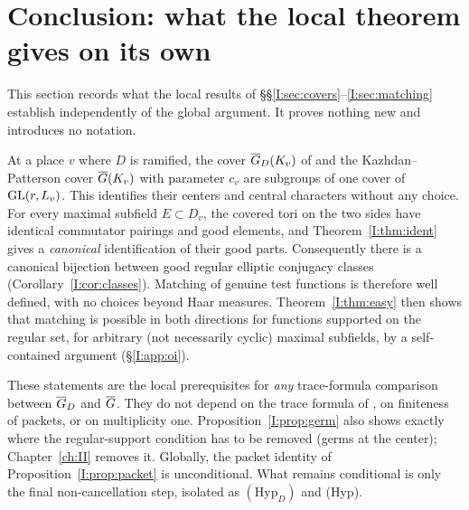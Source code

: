 \section{Conclusion: what the local theorem gives on its own}\label{I:sec:conclusion}
This section records what the local results of \S\S\ref{I:sec:covers}--\ref{I:sec:matching} establish independently of the global argument. It proves nothing new and introduces no notation.

At a place $v$ where $D$ is ramified, the cover $\overline{G}_D(K_v)$ of \cite{JC26a} and the Kazhdan--Patterson cover $\overline{G}(K_v)$ with parameter $c_v$ are subgroups of one cover of $\mathrm{GL}(r,L_v)$. This identifies their centers and central characters without any choice. For every maximal subfield $E\subset D_v$, the covered tori on the two sides have identical commutator pairings and good elements, and Theorem~\ref{I:thm:ident} gives a \emph{canonical} identification of their good parts. Consequently there is a canonical bijection between good regular elliptic conjugacy classes (Corollary~\ref{I:cor:classes}). Matching of genuine test functions is therefore well defined, with no choices beyond Haar measures. Theorem~\ref{I:thm:easy} then shows that matching is possible in both directions for functions supported on the regular set, for arbitrary (not necessarily cyclic) maximal subfields, by a self-contained argument (\S\ref{I:app:oi}).

These statements are the local prerequisites for \emph{any} trace-formula comparison between $\overline{G}_D$ and $\overline{G}$. They do not depend on the trace formula of \cite{FK86}, on finiteness of packets, or on multiplicity one. Proposition~\ref{I:prop:germ} also shows exactly where the regular-support condition has to be removed (germs at the center); Chapter~\ref{ch:II} removes it. Globally, the packet identity of Proposition~\ref{I:prop:packet} is unconditional. What remains conditional is only the final non-cancellation step, isolated as $(\mathrm{Hyp}_D)$ and (Hyp).
\endgroup
